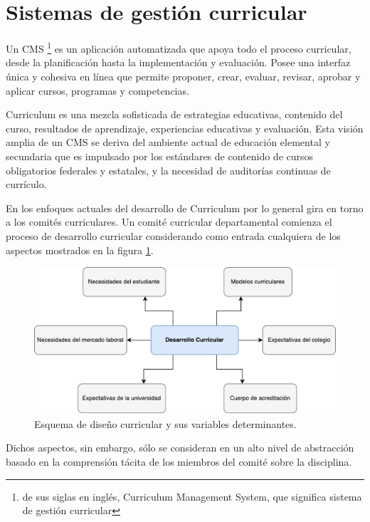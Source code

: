 \section{Sistemas de gestión curricular}
Un CMS \footnote{de sus siglas en inglés, Curriculum Management System, que significa sistema de gestión curricular} es un aplicación automatizada que apoya todo el proceso curricular, desde la planificación hasta la implementación y evaluación. Posee una interfaz única y cohesiva en línea que permite proponer, crear, evaluar, revisar, aprobar y aplicar cursos, programas y competencias\citep{harden2001amee}.

Curriculum es una mezcla sofisticada de estrategias educativas, contenido del curso, resultados de aprendizaje, experiencias educativas y evaluación. Esta visión amplia de un CMS se deriva del ambiente actual de educación elemental y secundaria que es impulsado por los estándares de contenido de cursos obligatorios federales y estatales, y la necesidad de auditorías continuas de currículo\citep{west2000technology}.

En los enfoques actuales del desarrollo de Curriculum por lo general gira en torno a los comités curriculares. Un comité curricular departamental comienza el proceso de desarrollo curricular considerando como entrada cualquiera de los aspectos mostrados en la figura \ref{diseno_curricular}.

\begin{figure}[H]
\centering
\includegraphics[width=125mm,scale=1]{Figuras/diseno_curricular}
\caption{Esquema de diseño curricular y sus variables determinantes.}
  \label{diseno_curricular}
\end{figure}


Dichos aspectos, sin embargo, sólo se consideran en un alto nivel de abstracción basado en la comprensión tácita de los miembros del comité sobre la disciplina.